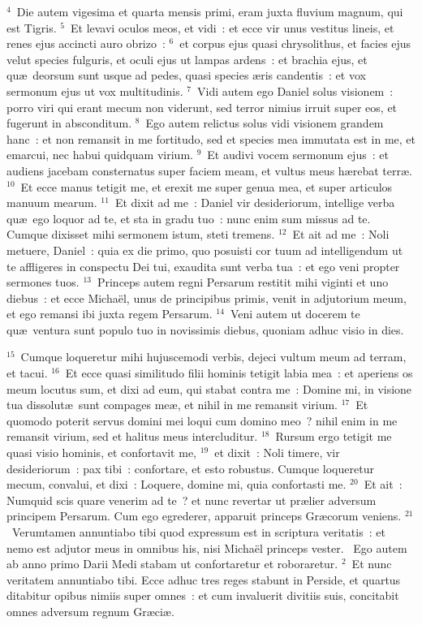 ${}^{4}$~Die autem vigesima et quarta mensis primi, eram juxta fluvium magnum, qui est Tigris.
${}^{5}$~Et levavi oculos meos, et vidi~: et ecce vir unus vestitus lineis, et renes ejus accincti auro obrizo~:
${}^{6}$~et corpus ejus quasi chrysolithus, et facies ejus velut species fulguris, et oculi ejus ut lampas ardens~: et brachia ejus, et qu\ae\ deorsum sunt usque ad pedes, quasi species \ae ris candentis~: et vox sermonum ejus ut vox multitudinis.
${}^{7}$~Vidi autem ego Daniel solus visionem~: porro viri qui erant mecum non viderunt, sed terror nimius irruit super eos, et fugerunt in absconditum.
${}^{8}$~Ego autem relictus solus vidi visionem grandem hanc~: et non remansit in me fortitudo, sed et species mea immutata est in me, et emarcui, nec habui quidquam virium.
${}^{9}$~Et audivi vocem sermonum ejus~: et audiens jacebam consternatus super faciem meam, et vultus meus h\ae rebat terr\ae .
${}^{10}$~Et ecce manus tetigit me, et erexit me super genua mea, et super articulos manuum mearum.
${}^{11}$~Et dixit ad me~: Daniel vir desideriorum, intellige verba qu\ae\ ego loquor ad te, et sta in gradu tuo~: nunc enim sum missus ad te. Cumque dixisset mihi sermonem istum, steti tremens.
${}^{12}$~Et ait ad me~: Noli metuere, Daniel~: quia ex die primo, quo posuisti cor tuum ad intelligendum ut te affligeres in conspectu Dei tui, exaudita sunt verba tua~: et ego veni propter sermones tuos.
${}^{13}$~Princeps autem regni Persarum restitit mihi viginti et uno diebus~: et ecce Micha\"el, unus de principibus primis, venit in adjutorium meum, et ego remansi ibi juxta regem Persarum.
${}^{14}$~Veni autem ut docerem te qu\ae\ ventura sunt populo tuo in novissimis diebus, quoniam adhuc visio in dies.


${}^{15}$~Cumque loqueretur mihi hujuscemodi verbis, dejeci vultum meum ad terram, et tacui.
${}^{16}$~Et ecce quasi similitudo filii hominis tetigit labia mea~: et aperiens os meum locutus sum, et dixi ad eum, qui stabat contra me~: Domine mi, in visione tua dissolut\ae\ sunt compages me\ae , et nihil in me remansit virium.
${}^{17}$~Et quomodo poterit servus domini mei loqui cum domino meo~? nihil enim in me remansit virium, sed et halitus meus intercluditur.
${}^{18}$~Rursum ergo tetigit me quasi visio hominis, et confortavit me,
${}^{19}$~et dixit~: Noli timere, vir desideriorum~: pax tibi~: confortare, et esto robustus. Cumque loqueretur mecum, convalui, et dixi~: Loquere, domine mi, quia confortasti me.
${}^{20}$~Et ait~: Numquid scis quare venerim ad te~? et nunc revertar ut pr\ae lier adversum principem Persarum. Cum ego egrederer, apparuit princeps Gr\ae corum veniens.
${}^{21}$~Verumtamen annuntiabo tibi quod expressum est in scriptura veritatis~: et nemo est adjutor meus in omnibus his, nisi Micha\"el princeps vester.
~Ego autem ab anno primo Darii Medi stabam ut confortaretur et roboraretur.
${}^{2}$~Et nunc veritatem annuntiabo tibi. Ecce adhuc tres reges stabunt in Perside, et quartus ditabitur opibus nimiis super omnes~: et cum invaluerit divitiis suis, concitabit omnes adversum regnum Gr\ae ci\ae .


